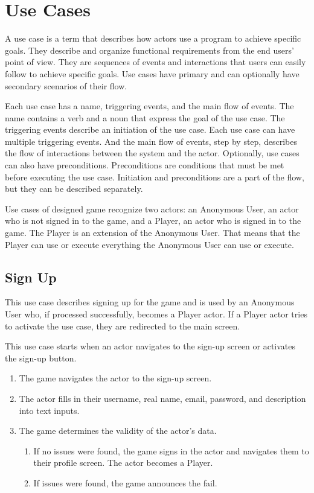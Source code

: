 \section{Use Cases}

A use case is a term that describes how actors use a program to achieve specific goals.
They describe and organize functional requirements from the end users' point of view.
They are sequences of events and interactions that users can easily follow to achieve specific goals.
Use cases have primary and can optionally have secondary scenarios of their flow.

Each use case has a name, triggering events, and the main flow of events.
The name contains a verb and a noun that express the goal of the use case.
The triggering events describe an initiation of the use case.
Each use case can have multiple triggering events.
And the main flow of events, step by step, describes the flow of interactions between the system and the actor.
Optionally, use cases can also have preconditions.
Preconditions are conditions that must be met before executing the use case.
Initiation and preconditions are a part of the flow, but they can be described separately.

Use cases of designed game recognize two actors: an Anonymous User, an actor who is not signed in to the game, and a Player, an actor who is signed in to the game.
The Player is an extension of the Anonymous User.
That means that the Player can use or execute everything the Anonymous User can use or execute.

\let\oldsubsection=\thesubsection
\renewcommand\thesubsection{UC\arabic{subsection}}

\pagebreak
\subsection{Sign Up}

This use case describes signing up for the game and is used by an Anonymous User who, if processed successfully, becomes a Player actor. If a Player actor tries to activate the use case, they are redirected to the main screen.

This use case starts when an actor navigates to the sign-up screen or activates the sign-up button.

\begin{enumerate}
    \item The game navigates the actor to the sign-up screen.
    \item The actor fills in their username, real name, email, password, and description into text inputs.
    \item The game determines the validity of the actor's data.
    \begin{enumerate}
        \item If no issues were found, the game signs in the actor and navigates them to their profile screen.
        The actor becomes a Player.
        \item If issues were found, the game announces the fail.
    \end{enumerate}
\end{enumerate}

